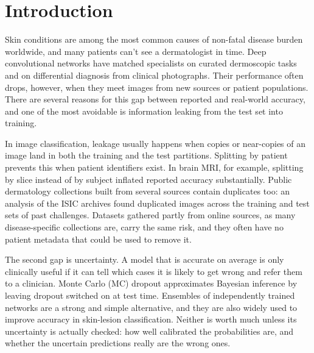 \documentclass[11pt]{article}
\begin{document}
\section*{Introduction}
Skin conditions are among the most common causes of non-fatal disease burden worldwide\cite{karimkhani2017gbd}, and many patients can't see a dermatologist in time. Deep convolutional networks have matched specialists on curated dermoscopic tasks\cite{esteva2017,haenssle2018} and on differential diagnosis from clinical photographs\cite{liu2020}. Their performance often drops, however, when they meet images from new sources or patient populations\cite{daneshjou2022}. There are several reasons for this gap between reported and real-world accuracy, and one of the most avoidable is information leaking from the test set into training\cite{kapoor2023,varoquaux2022,roberts2021}.

In image classification, leakage usually happens when copies or near-copies of an image land in both the training and the test partitions. Splitting by patient prevents this when patient identifiers exist. In brain MRI, for example, splitting by slice instead of by subject inflated reported accuracy substantially\cite{yagis2021}. Public dermatology collections built from several sources contain duplicates too: an analysis of the ISIC archives found duplicated images across the training and test sets of past challenges\cite{cassidy2022}. Datasets gathered partly from online sources, as many disease-specific collections are, carry the same risk, and they often have no patient metadata that could be used to remove it.

The second gap is uncertainty. A model that is accurate on average is only clinically useful if it can tell which cases it is likely to get wrong and refer them to a clinician\cite{leibig2017}. Monte Carlo (MC) dropout approximates Bayesian inference by leaving dropout switched on at test time\cite{gal2016dropout,kendall2017}. Ensembles of independently trained networks are a strong and simple alternative\cite{lakshminarayanan2017,ovadia2019}, and they are also widely used to improve accuracy in skin-lesion classification\cite{harangi2018}. Neither is worth much unless its uncertainty is actually checked: how well calibrated the probabilities are\cite{guo2017calibration}, and whether the uncertain predictions really are the wrong ones.
\end{document}
